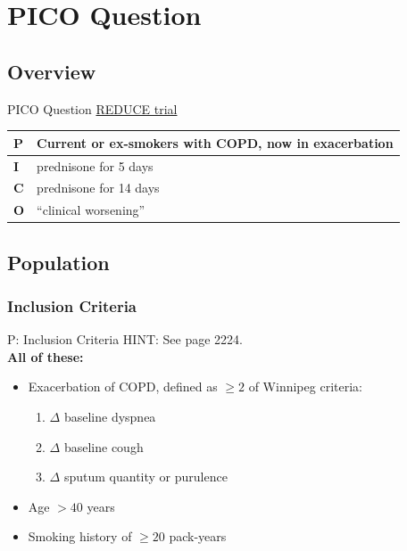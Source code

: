 \documentclass{beamer}
\newcommand{\pro}{\textcolor{blue}}
\newcommand{\reduce}{\href{https://doi.org/10.1001/jama.2013.5023}{REDUCE trial}}
\begin{document}
\section{PICO Question}
	\subsection{Overview}
		\begin{frame}{PICO Question}
			\centering
			\pro{\reduce}
			\begin{tabular}{l | l}
				\hline
				\textbf{P} & Current or ex-smokers with COPD, now in exacerbation \\
				\hline
				\textbf{I} & prednisone for 5 days \\
				\hline
				\textbf{C} & prednisone for 14 days \\
				\hline
				\textbf{O} & ``clinical worsening'' \\
				\hline
			\end{tabular}
		\end{frame}
	\subsection{Population}
		\subsubsection{Inclusion Criteria}
		\begin{frame}{P: Inclusion Criteria}
			HINT: See page 2224. \\
			\pause
			\textbf{All of these:}
					\begin{itemize}
					\item Exacerbation of COPD, defined as $\geq 2$ of Winnipeg criteria:
					\begin{enumerate}
						\item $\Delta$ baseline dyspnea
						\item $\Delta$ baseline cough
						\item $\Delta$ sputum quantity or purulence
					\end{enumerate}
					\item Age $>40$ years
					\item Smoking history of $\geq 20$ pack-years
				\end{itemize}
		\end{frame}
\end{document}
